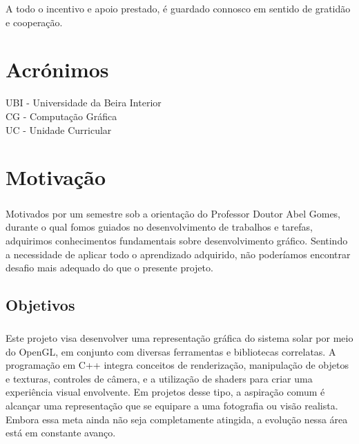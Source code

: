 \documentclass[12pt,a4paper]{memoir}
\begin{document}
A todo o incentivo e apoio prestado, é guardado connosco em sentido de
gratidão e cooperação.
\clearpage{\thispagestyle{empty}\cleardoublepage}





\clearpage{\thispagestyle{empty}\cleardoublepage}



\chapter*{Acrónimos}
\label{chap:acro}
UBI - Universidade da Beira Interior\\
CG - Computação Gráfica\\
UC - Unidade Curricular\\
\printglossaries

\newpage
\tableofcontents



\mainmatter



\chapter{Motivação}
\label{chap:intro}
\label{sec:mot}
\paragraph{}
Motivados por um semestre sob a orientação do Professor Doutor Abel Gomes, durante o qual fomos guiados no desenvolvimento de trabalhos e tarefas, adquirimos conhecimentos fundamentais sobre desenvolvimento gráfico. Sentindo a necessidade de aplicar todo o aprendizado adquirido, não poderíamos encontrar desafio mais adequado do que o presente projeto.

\section{Objetivos}
\label{sec:obj}
\paragraph{}
Este projeto visa desenvolver uma representação gráfica do sistema solar por meio do OpenGL, em conjunto com diversas ferramentas e bibliotecas correlatas. A programação em C++ integra conceitos de renderização, manipulação de objetos e texturas, controles de câmera, e a utilização de shaders para criar uma experiência visual envolvente. Em projetos desse tipo, a aspiração comum é alcançar uma representação que se equipare a uma fotografia ou visão realista. Embora essa meta ainda não seja completamente atingida, a evolução nessa área está em constante avanço.
\end{document}
